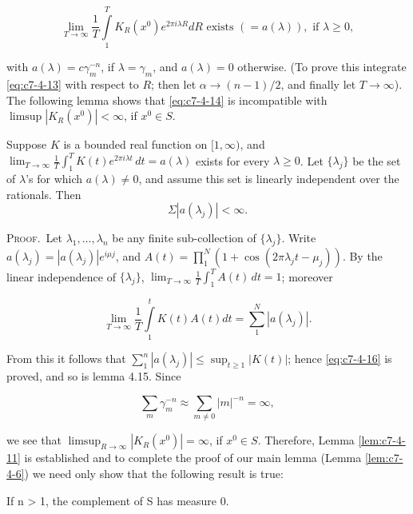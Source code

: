 \begin{equation}\label{eq:c7-4-14}
\lim_{T\to\infty}\frac{1}{T}\int\limits_{1}^{T}K_{R}(x^{0})e^{2\pi i\lambda R}d R\text{ exists }(=a(\lambda)),\text{ if }\lambda\geq0,
\end{equation}

with $a(\lambda) = c\gamma_m^{-n}$, if $\lambda = \gamma_m$, and $a(\lambda) = 0$ otherwise. (To prove this integrate \eqref{eq:c7-4-13} with respect to $R$; then let $\alpha \to (n-1)/2$, and finally let $T \to \infty$). The following lemma shows that \eqref{eq:c7-4-14} is incompatible with $\limsup |K_R(x^0)| < \infty$, if $x^0 \in S$.

\begin{lemma}
\label{lem:c7-4-15}
Suppose $K$ is a bounded real function on $[1, \infty)$, and $\lim_{T \to \infty} \frac{1}{T} \int_{1}^{T} K(t) e^{2\pi i \lambda t} \, dt = a(\lambda)$ exists for every $\lambda \geq 0$. Let $\{\lambda_j\}$ be the set of $\lambda$'s for which $a(\lambda) \neq 0$, and assume this set is linearly independent over the
rationals. Then
\begin{equation}\label{eq:c7-4-16}
\Sigma|a(\lambda_{j})|<\infty.
\end{equation}

\end{lemma}

\textsc{Proof.}\ Let $\lambda_{1}, \ldots, \lambda_{n}$ be any finite sub-collection of $\{\lambda_{j}\}$. Write $a(\lambda_{j}) = |a(\lambda_{j})| e^{i\mu j}$, and $A(t) = \prod_{1}^{N} (1 + \cos (2\pi\lambda_{j}t - \mu_{j}))$. By the linear independence of $\{\lambda_{j}\}$, $\lim_{T \to \infty} \frac{1}{T} \int_{1}^{T} A(t) \, dt = 1$; moreover

\[
\lim_{T\to\infty}\frac{1}{T}\int\limits_{1}^{t}K(t)A(t)dt=\sum_{1}^{N}|a(\lambda_{j})|.
\]

From this it follows that $\sum_{1}^{n} |a(\lambda_j)| \leq \sup_{t \geq 1} |K(t)|$; hence \eqref{eq:c7-4-16} is proved, and so is lemma 4.15. Since

\[
\sum_{m}\gamma_{m}^{-n}\approx\sum_{m\neq0}|m|^{-n}=\infty,
\]

we see that $\limsup_{R \to \infty} |K_R(x^0)| = \infty$, if $x^0 \in S$. Therefore, Lemma \ref{lem:c7-4-11} is established and to complete the proof of our main lemma (Lemma \ref{lem:c7-4-6}) we need only show that the following result is true:

\begin{lemma}
\label{lem:c7-4-17}
If n > 1, the complement of S has measure 0.
\end{lemma}

